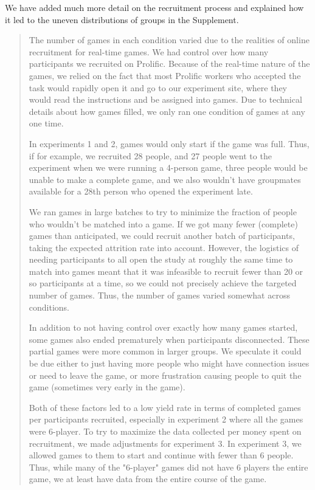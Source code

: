 \documentclass{stanfordletter}
\newcommand{\revised}[1]{\begin{quote}	#1 \end{quote}}
\begin{document}
\begin{letter}{}
	We have added much more detail on the recruitment process and explained how it led to the uneven distributions of groups in the Supplement.     
	
          \revised{The number of games in each condition varied due to the realities of online recruitment for real-time games. We had control over how many participants we recruited on Prolific. Because of the real-time nature of the games, we relied on the fact that most Prolific workers who accepted the task would rapidly open it and go to our experiment site, where they would read the instructions and be assigned into games. Due to technical details about how games filled, we only ran one condition of games at any one time.
          	
          	In experiments 1 and 2, games would only start if the game was full. Thus, if for example, we recruited 28 people, and 27 people went to the experiment when we were running a 4-person game, three people would be unable to make a complete game, and we also wouldn't have groupmates available for a 28th person who opened the experiment late. 
          	
          	We ran games in large batches to try to minimize the fraction of people who wouldn't be matched into a game. If we got many fewer (complete) games than anticipated, we could recruit another batch of participants, taking the expected attrition rate into account. However, the logistics of needing participants to all open the study at roughly the same time to match into games meant that it was infeasible to recruit fewer than 20 or so participants at a time, so we could not precisely achieve the targeted number of games. Thus, the number of games varied somewhat across conditions. 
          	
          	In addition to not having control over exactly how many games started, some games also ended prematurely when participants disconnected. These partial games were more common in larger groups. We speculate it could be due either to just having more people who might have connection issues or need to leave the game, or more frustration causing people to quit the game (sometimes very early in the game). 
          	
          	Both of these factors led to a low yield rate in terms of completed games per participants recruited, especially in experiment 2 where all the games were 6-player. To try to maximize the data collected per money spent on recruitment, we made adjustments for experiment 3. 
          	In experiment 3, we allowed games to them to start and continue with fewer than 6 people. Thus, while many of the "6-player" games did not have 6 players the entire game, we at least have data from the entire course of the game. }
          

\end{letter}
\end{document}
